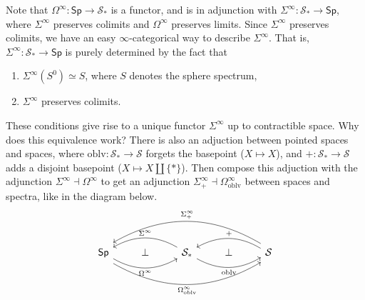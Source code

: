 Note that $\Omega ^{\infty}\colon \mathsf{Sp}  \to \mathcal{S} _*$ is a functor, and is in adjunction with $\Sigma ^{\infty} \colon \mathcal{S} _* \to \mathsf{Sp} $, where $\Sigma ^{\infty}$ preserves colimits and $\Omega ^{\infty}$ preserves limits. Since $\Sigma ^{\infty}$ preserves colimits, we have an easy $\infty$-categorical way to describe $\Sigma^{\infty}$. That is, $\Sigma ^{\infty} \colon \mathcal{S} _* \to \mathsf{Sp} $ is purely determined by the fact that 
\begin{enumerate}[label=(\roman*)]
\setlength\itemsep{-.2em}
    \item $\Sigma ^{\infty}(S^0)\simeq S$, where $S$ denotes the sphere spectrum,
    \item $\Sigma ^{\infty}$ preserves colimits.
\end{enumerate}These conditions give rise to a unique functor $\Sigma ^{\infty}$ up to contractible space. Why does this equivalence work? There is also an adjuction between pointed spaces and spaces, where $\mathrm{oblv }\colon \mathcal{S} _* \to \mathcal{S} $ forgets the basepoint ($X \mapsto X$), and $+ \colon \mathcal{S} _* \to \mathcal{S} $ adds a disjoint basepoint ($X \mapsto X\amalg \{*\} $). Then compose this adjuction with the adjunction $\Sigma ^{\infty}\dashv \Omega ^{\infty}$ to get an adjunction $\Sigma ^{\infty}_+ \dashv \Omega ^{ \infty}_{\mathrm{oblv}}$ between spaces and spectra, like in the diagram below. \[
\begin{tikzcd}
\mathsf{Sp} \arrow[rr, "\Omega^{\infty}"', bend right] \arrow[rrrr, "\Omega^{\infty}_{\mathrm{oblv}}"', bend right, shift right=2] & \perp & \mathcal S_* \arrow[ll, "\Sigma ^{\infty}"', bend right] \arrow[rr, "\mathrm{oblv}"', bend right] & \perp & \mathcal S \arrow[ll, "+"', bend right] \arrow[llll, "\Sigma^{\infty}_+"', bend right, shift right=2]
\end{tikzcd}\] 
